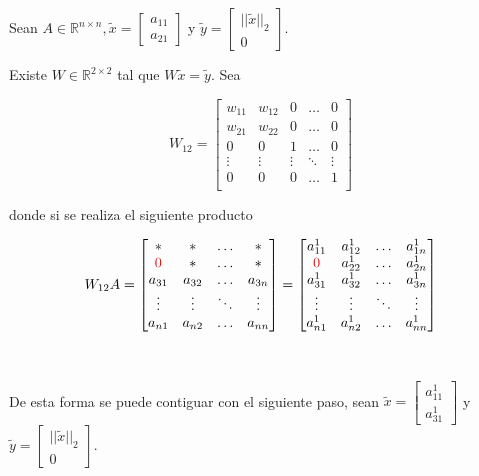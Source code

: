 Sean $A \in \mathbb{R}^{n \times n}, \tilde{x} = \begin{bmatrix}
    a_{11} \\ a_{21}
\end{bmatrix}$ y $\tilde{y} = \begin{bmatrix}
    {||\tilde{x}||}_{2} \\ 0
\end{bmatrix}$.


Existe $W \in \mathbb{R}^{2 \times 2}$ tal que $W\tilde{x} = \tilde{y}$. Sea

\[
W_{12} =
\begin{bmatrix}
    w_{11} & w_{12} & 0 & \ldots & 0 \\
    w_{21} & w_{22} & 0 & \ldots & 0 \\
    0 & 0 & 1 & \ldots & 0 \\
    \vdots & \vdots & \vdots & \ddots & \vdots \\
    0 & 0 & 0 & \ldots & 1 \\
\end{bmatrix}
\]

donde si se realiza el siguiente producto

\[
W_{12}A =
\begin{bmatrix}
    * & * & \ldots & * \\
    \textcolor{red}{0} & * & \ldots & * \\
    a_{31} & a_{32} & \ldots & a_{3n} \\
    \vdots & \vdots & \ddots & \vdots \\
    a_{n1} & a_{n2} & \ldots & a_{nn} \\
\end{bmatrix}
=
\begin{bmatrix}
    a_{11}^{1} & a_{12}^{1} & \ldots & a_{1n}^{1} \\
    \textcolor{red}{0} & a_{22}^{1} & \ldots & a_{2n}^{1} \\
    a_{31}^{1} & a_{32}^{1} & \ldots & a_{3n}^{1} \\
    \vdots & \vdots & \ddots & \vdots \\
    a_{n1}^{1} & a_{n2}^{1} & \ldots & a_{nn}^{1} \\
\end{bmatrix}
\]

\

\noindent De esta forma se puede contiguar con el siguiente paso, sean $\tilde{x} = \begin{bmatrix}
    a_{11}^1 \\ a_{31}^1
\end{bmatrix}$ y $\tilde{y} = \begin{bmatrix}
    {||\tilde{x}||}_{2} \\ 0
\end{bmatrix}$.

